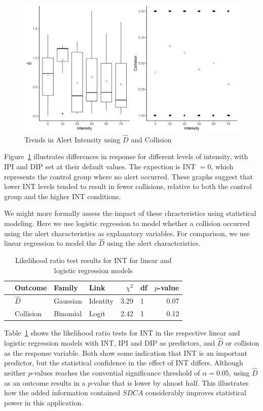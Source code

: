 \documentclass{article}
\begin{document}
\begin{figure}[h!]
\begin{center}
\includegraphics[width=.8\textwidth]{fig3.png}
\caption{Trends in Alert Intensity using $\hat{D}$ and Collision}
\label{figure 3}
\end{center}
\end{figure}

Figure~\ref{figure 3} illustrates differences in response for different levels of intensity, with IPI and DIP set at their default values.  The expection is INT $=0$, which represents the control group where no alert occurred.  These graphs suggest that lower INT levels tended to result in fewer collisions, relative to both the control group and the higher INT conditions.

We might more formally assess the impact of these chracteristics using statistical modeling.  Here we use logistic regression to model whether a collision occurred using the alert characteristics as explanatory variables.  For comparison, we use linear regression to model the $\hat{D}$ using the alert characteristics.

\begin{table}[hbt]
\centering
\begin{tabular}{rlllrlr}
  \hline
 & Outcome & Family & Link & $\chi^2$ & df & $p$-value \\ 
  \hline
 & $\hat{D} $ & Gaussian & Identity & 3.29 & 1 & 0.07 \\ 
  & Collision & Binomial & Logit & 2.42 & 1 & 0.12 \\ 
   \hline
\end{tabular}
\caption{Likelihood ratio test results for INT for linear and logistic regression models}
\label{table 1}
\end{table}


Table~\ref{table 1} shows the likelihood ratio tests for INT in the respective linear and logistic regression models with INT, IPI and DIP as predictors, and $\hat{D}$ or collision as the response variable. Both show some indication that INT is an important predictor, but the statistical confidence in the effect of INT differs. Although neither $p$-values reaches the convential significance threshold of $\alpha = 0.05$, using $\hat{D}$ as an outcome results in a $p$-value that is lower by almost half.  This illustrates how the added information contained $SDCA$ considerably improves statistical power in this application.
\end{document}
